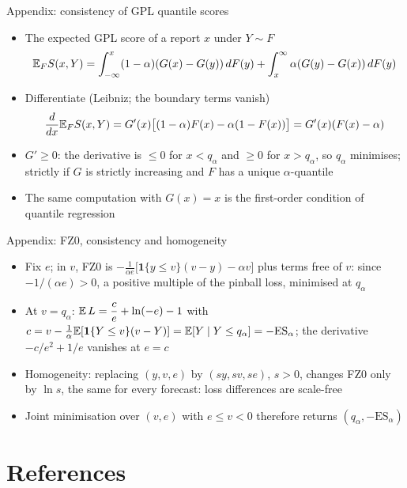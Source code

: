\begin{frame}{Appendix: consistency of GPL quantile scores}
\hypertarget{atsapp1}{}
\itemsize{\small}
\begin{itemize}
    \item The expected GPL score of a report $x$ under $Y \sim F$
    \[ \mathbb{E}_F S(x, Y) = \int_{-\infty}^x(1 - \alpha)(G(x) - G(y))\,dF(y) + \int_x^\infty \alpha(G(y) - G(x))\,dF(y) \]
    \item Differentiate (Leibniz; the boundary terms vanish)
    \[ \frac{d}{dx}\mathbb{E}_F S(x, Y) = G'(x)\big[(1 - \alpha)F(x) - \alpha(1 - F(x))\big] = G'(x)(F(x) - \alpha) \]
    \item $G' \ge 0$: the derivative is $\le 0$ for $x < q_\alpha$ and $\ge 0$ for $x > q_\alpha$, so $q_\alpha$ minimises; strictly if $G$ is strictly increasing and $F$ has a unique $\alpha$-quantile
    \item The same computation with $G(x) = x$ is the first-order condition of quantile regression
\end{itemize}
\end{frame}

\begin{frame}{Appendix: FZ0, consistency and homogeneity}
\hypertarget{atsapp2}{}
\itemsize{\small}
\begin{itemize}
    \item Fix $e$; in $v$, FZ0 is $-\frac{1}{\alpha e}\big[\mathbf 1\{y \le v\}(v - y) - \alpha v\big]$ plus terms free of $v$: since $-1/(\alpha e) > 0$, a positive multiple of the pinball loss, minimised at $q_\alpha$
    \item At $v = q_\alpha$: $\mathbb{E}\,L = \dfrac{c}{e} + \ln(-e) - 1$ with $c = v - \frac1\alpha\mathbb{E}[\mathbf 1\{Y \le v\}(v - Y)] = \mathbb{E}[Y \mid Y \le q_\alpha] = -\mathrm{ES}_\alpha$; the derivative $-c/e^2 + 1/e$ vanishes at $e = c$
    \item Homogeneity: replacing $(y, v, e)$ by $(sy, sv, se)$, $s > 0$, changes FZ0 only by $\ln s$, the same for every forecast: loss differences are scale-free
    \item Joint minimisation over $(v, e)$ with $e \le v < 0$ therefore returns $(q_\alpha, -\mathrm{ES}_\alpha)$
\end{itemize}
\end{frame}


\section{References}

